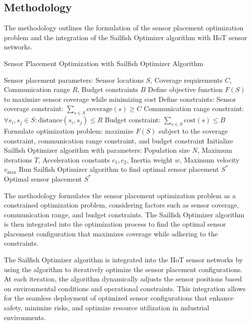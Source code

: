 \documentclass[conference]{IEEEtran}
\begin{document}
\subsection{Methodology}
The methodology outlines the formulation of the sensor placement optimization problem and the integration of the Sailfish Optimizer algorithm with IIoT sensor networks.

\begin{algorithm}
\caption{Sensor Placement Optimization with Sailfish Optimizer Algorithm}
\label{alg:methodology}
\begin{algorithmic}[1]
\REQUIRE Sensor placement parameters: Sensor locations $S$, Coverage requirements $C$, Communication range $R$, Budget constraints $B$
\STATE Define objective function $F(S)$ to maximize sensor coverage while minimizing cost
\STATE Define constraints:
    \STATE \quad Sensor coverage constraint: $\sum_{s \in S} \text{coverage}(s) \geq C$
    \STATE \quad Communication range constraint: $\forall s_i, s_j \in S: \text{distance}(s_i, s_j) \leq R$
    \STATE \quad Budget constraint: $\sum_{s \in S} \text{cost}(s) \leq B$
\STATE Formulate optimization problem:
\STATE \quad maximize $F(S)$
\STATE \quad subject to the coverage constraint, communication range constraint, and budget constraint
\STATE Initialize Sailfish Optimizer algorithm with parameters: Population size $N$, Maximum iterations $T$, Acceleration constants $c_1, c_2$, Inertia weight $w$, Maximum velocity $v_{\text{max}}$
\STATE Run Sailfish Optimizer algorithm to find optimal sensor placement $S^*$
\RETURN Optimal sensor placement $S^*$
\end{algorithmic}
\end{algorithm}

The methodology formulates the sensor placement optimization problem as a constrained optimization problem, considering factors such as sensor coverage, communication range, and budget constraints. The Sailfish Optimizer algorithm is then integrated into the optimization process to find the optimal sensor placement configuration that maximizes coverage while adhering to the constraints.

The Sailfish Optimizer algorithm is integrated into the IIoT sensor networks by using the algorithm to iteratively optimize the sensor placement configurations. At each iteration, the algorithm dynamically adjusts the sensor positions based on environmental conditions and operational constraints. This integration allows for the seamless deployment of optimized sensor configurations that enhance safety, minimize risks, and optimize resource utilization in industrial environments.
\end{document}
